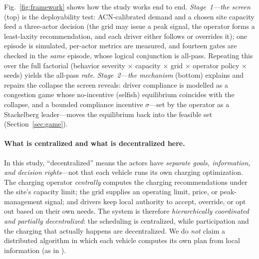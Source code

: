 \documentclass[12pt]{article}
\newcommand{\figref}[1]{Fig.~\ref{#1}}
\begin{document}
\figref{fig:framework} shows how the study works end to end. \emph{Stage~1---the screen} (top) is the deployability test: ACN-calibrated demand and a chosen site capacity feed a three-actor decision (the grid may issue a peak signal, the operator forms a least-laxity recommendation, and each driver either follows or overrides it); one episode is simulated, per-actor metrics are measured, and fourteen gates are checked in the \emph{same} episode, whose logical conjunction is all-pass. Repeating this over the full factorial (behavior severity $\times$ capacity $\times$ grid $\times$ operator policy $\times$ seeds) yields the all-pass \emph{rate}. \emph{Stage~2---the mechanism} (bottom) explains and repairs the collapse the screen reveals: driver compliance is modelled as a congestion game whose no-incentive (selfish) equilibrium coincides with the collapse, and a bounded compliance incentive $\sigma$---set by the operator as a Stackelberg leader---moves the equilibrium back into the feasible set (Section~\ref{sec:game}).

\paragraph{What is centralized and what is decentralized here.} In this study, ``decentralized'' means the actors have \emph{separate goals, information, and decision rights}---not that each vehicle runs its own charging optimization. The charging operator \emph{centrally} computes the charging recommendations under the site's capacity limit; the grid supplies an operating limit, price, or peak-management signal; and drivers keep local authority to accept, override, or opt out based on their own needs. The system is therefore \emph{hierarchically coordinated and partially decentralized}: the scheduling is centralized, while participation and the charging that actually happens are decentralized. We do \emph{not} claim a distributed algorithm in which each vehicle computes its own plan from local information (as in \cite{ma2013,gan2013,liu2019decentralized}).
\end{document}
